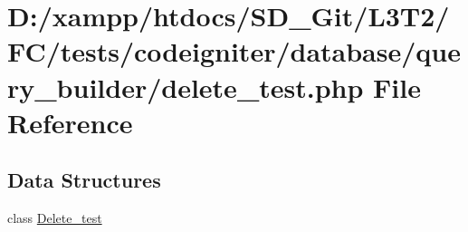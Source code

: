\hypertarget{delete__test_8php}{}\section{D\+:/xampp/htdocs/\+S\+D\+\_\+\+Git/\+L3\+T2/\+F\+C/tests/codeigniter/database/query\+\_\+builder/delete\+\_\+test.php File Reference}
\label{delete__test_8php}
\subsection*{Data Structures}
\begin{DoxyCompactItemize}
\item 
class \hyperlink{class_delete__test}{Delete\+\_\+test}
\end{DoxyCompactItemize}
